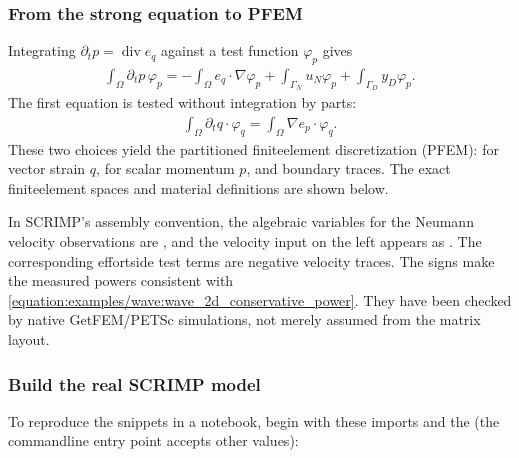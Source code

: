 \documentclass[letterpaper,10pt,english]{sphinxmanual}
\begin{document}
\subsubsection{From the strong equation to PFEM}
\label{\detokenize{examples/wave:from-the-strong-equation-to-pfem}}
\sphinxAtStartPar
Integrating \(\partial_t p=\operatorname{div}e_q\)
against a test function \(\varphi_p\) gives
\begin{equation*}
\begin{split}\int_\Omega\partial_t p\,\varphi_p
=-\int_\Omega e_q\cdot\nabla\varphi_p
 +\int_{\Gamma_N}u_N\varphi_p
 +\int_{\Gamma_D}y_D\varphi_p.\end{split}
\end{equation*}
\sphinxAtStartPar
The first equation is tested without integration by parts:
\begin{equation*}
\begin{split}\int_\Omega\partial_t q\cdot\varphi_q
=\int_\Omega\nabla e_p\cdot\varphi_q.\end{split}
\end{equation*}
\sphinxAtStartPar
These two choices yield the partitioned finite\sphinxhyphen{}element
discretization (PFEM):  for vector strain
\(q\),  for scalar momentum \(p\),
and  boundary traces. The exact finite\sphinxhyphen{}element
spaces and material definitions are shown below.

\sphinxAtStartPar
In SCRIMP’s assembly convention, the 
algebraic variables for the Neumann velocity observations
are , and the
velocity input on the left appears as .
The corresponding effort\sphinxhyphen{}side test terms are negative
velocity traces. The signs make the measured
powers consistent with \eqref{equation:examples/wave:wave_2d_conservative_power}.
They have been checked by native GetFEM/PETSc simulations,
not merely assumed from the matrix layout.


\subsubsection{Build the real SCRIMP model}
\label{\detokenize{examples/wave:build-the-real-scrimp-model}}
\sphinxAtStartPar
To reproduce the snippets in a notebook, begin with these
imports and the  (the command\sphinxhyphen{}line entry
point accepts other values):
\end{document}
